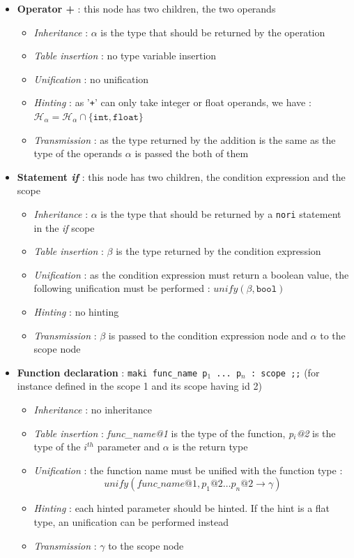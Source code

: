 \documentclass[a4paper,11pt]{article}
\begin{document}
\begin{itemize}
	\item \textbf{Operator +} : this node has two children, the two operands
	\begin{itemize}
		\item \textit{Inheritance} : $\alpha$ is the type that should be returned by the operation
		\item \textit{Table insertion} : no type variable insertion
		\item \textit{Unification} : no unification
		\item \textit{Hinting} : as '\texttt{+}' can only take integer or float operands, we have : $\mathcal{H}_\alpha = \mathcal{H}_\alpha \cap \{\texttt{int}, \texttt{float}\}$
		\item \textit{Transmission} : as the type returned by the addition is the same as the type of the operands $\alpha$ is passed the both of them
	\end{itemize}
	\item \textbf{Statement \textit{if}} : this node has two children, the condition expression and the scope
	\begin{itemize}
		\item \textit{Inheritance} : $\alpha$ is the type that should be returned by a \texttt{nori} statement in the \textit{if} scope
		\item \textit{Table insertion} : $\beta$ is the type returned by the condition expression
		\item \textit{Unification} : as the condition expression must return a boolean value, the following unification must be performed : $unify(\beta, \texttt{bool})$
		\item \textit{Hinting} : no hinting
		\item \textit{Transmission} : $\beta$ is passed to the condition expression node and $\alpha$ to the scope node
	\end{itemize}
	\item \textbf{Function declaration} : \texttt{maki func\_name p$_1$ ... p$_n$ : scope ;;} (for instance defined in the scope 1 and its scope having id 2)
	\begin{itemize}
		\item \textit{Inheritance} : no inheritance
		\item \textit{Table insertion} : \textit{func\_name@1} is the type of the function, \textit{p$_i$@2} is the type of the $i^{th}$ parameter and $\alpha$ is the return type
		\item \textit{Unification} : the function name must be unified with the function type :
		\[ unify(\textit{func\_name@1}, \textit{p}_1\textit{@2} \hdots \textit{p}_n\textit{@2} \rightarrow \gamma) \]
		\item \textit{Hinting} : each hinted parameter should be hinted. If the hint is a flat type, an unification can be performed instead
		\item \textit{Transmission} : $\gamma$ to the scope node
	\end{itemize}
\end{itemize}
\end{document}

